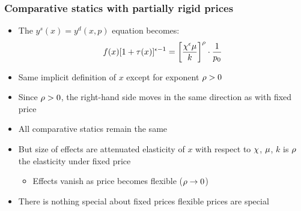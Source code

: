\documentclass[11pt,aspectratio=169,xcolor={dvipsnames},hyperref={pdftex,pdfpagemode=UseNone,hidelinks,pdfdisplaydoctitle=true},usepdftitle=false]{beamer}
\begin{document}
\begin{frame}
\frametitle{Comparative statics with partially rigid prices}
\begin{itemize}
\item The $y^s(x) = y^d(x,p)$ equation becomes:
\begin{equation*}
f(x)  [1+\tau(x)]^{\epsilon-1}= \left[ \frac{\chi^{\epsilon} \mu}{k} \right]^{\rho}\cdot \frac{1}{p_0} 
\end{equation*}
\item Same implicit definition of $x$ except for exponent $\rho>0$
\item Since $\rho>0$, the right-hand side moves in the same direction as with fixed price
\item All comparative statics remain the same
\item But size of effects are attenuated \then elasticity of $x$ with respect to $\chi$, $\mu$, $k$ is $\rho$ the elasticity under fixed price
\begin{itemize}
\item[\then] Effects vanish as price becomes flexible ($\rho\to 0$) 
\end{itemize}
\item There is nothing special about fixed prices \then flexible prices are special
\end{itemize}	
\end{frame}
\end{document}
